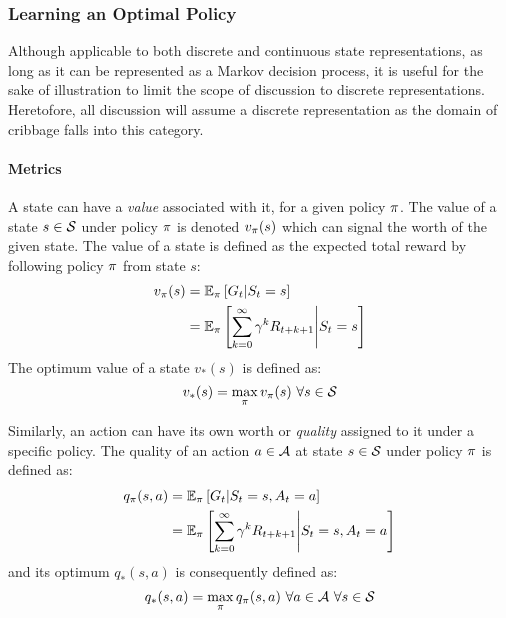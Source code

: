 \subsubsection*{Learning an Optimal Policy}


%
Although applicable to both discrete and continuous state representations,
as long as it can be represented as a Markov decision process,
it is useful for the sake of illustration to limit the scope of discussion to
discrete representations.
%
Heretofore, %
all discussion will assume a discrete representation
as the domain of cribbage falls into this category.

\paragraph*{Metrics}


A state can have a \textit{value} associated with it,
for a given policy $\pi$.
%
The value of a state $s \in \mathcal{S}$ under policy $\pi$ is denoted
$v_\pi(s)$
which can signal the worth of the given state.
%
The value of a state
is defined as the expected total reward by following policy $\pi$ from
state $s$:
\begin{align*}
	v_\pi(s) &= \mathbb{E}_\pi\left[G_t \middle| S_t = s\right] \\
		&= \mathbb{E}_\pi \left[
				\sum_{k=0}^{\infty} \gamma^k R_{t+k+1} \middle| S_t = s
			\right]
\end{align*}
%
The optimum value of a state $v_*(s)$ is defined as:
\[ v_*(s) = \max_\pi v_\pi(s)\ \forall s \in \mathcal{S} \]

Similarly,
an action can have its own worth or \textit{quality} assigned to it under a
specific policy.
%
The quality of an action $a\in\mathcal{A}$ at state $s\in\mathcal{S}$ under policy
$\pi$ is defined as:
\begin{align*}
	q_\pi(s,a)
		&= \mathbb{E}_\pi\left[ G_t \middle| S_t = s, A_t = a \right]
		\\
		&= \mathbb{E}_\pi\left[
				\sum_{k=0}^{\infty}\gamma^k R_{t+k+1} \middle| S_t = s, A_t = a
			\right]
\end{align*}
and its optimum $q_*(s,a)$ is consequently defined as:
\[
	q_*(s,a) = \max_{\policy}q_\policy(s,a)\ 
		\forall a\in\Actions\ \forall s\in\States
\]

